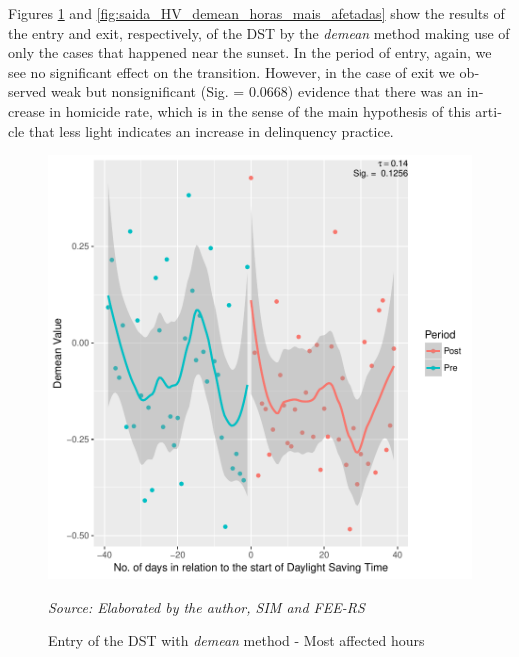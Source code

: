 \documentclass[12pt,openright,oneside,a4paper,english,french,spanish]{abntex2}
\numberwithin{table}{section} %
\numberwithin{figure}{section} %
\newcommand{\source}[1]{\textit{#1}}
\begin{document}
\begin{otherlanguage}{english}
Figures \ref{fig:entrada_HV_demean_horas_mais_afetadas} and \ref{fig:saida_HV_demean_horas_mais_afetadas} show the results of the entry and exit, respectively, of the DST by the \textit{demean} method making use of only the cases that happened near the sunset. In the period of entry, again, we see no significant effect on the transition. However, in the case of exit we observed weak but nonsignificant (Sig. = 0.0668) evidence that there was an increase in homicide rate, which is in the sense of the main hypothesis of this article that less light indicates an increase in delinquency practice.

\begin{figure}[H]
\begin{center}
\includegraphics{TESE_DE_DOUTORADO_RENAN_FINAL-plot_entrada_demean_pelo_GAM_horas_mais_afetadas}
\end{center}
\caption{Entry of the DST with \textit{demean} method - Most affected hours}
\source{Source: Elaborated by the author, SIM and FEE-RS}
\label{fig:entrada_HV_demean_horas_mais_afetadas}
\end{figure}



\end{otherlanguage}
\end{document}
